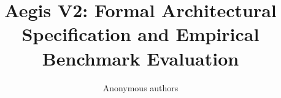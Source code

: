 \title{\textbf{Aegis V2: Formal Architectural Specification and Empirical Benchmark Evaluation}}

\author{Anonymous authors}
